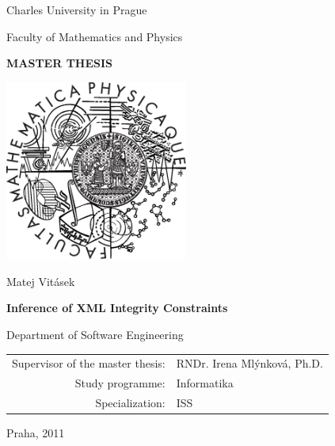 \documentclass[a4paper,12pt,twoside]{report}
\theoremstyle{definition}
\def\mfauthor{Matej Vitásek}
\def\mfadvisor{RNDr. Ire\-na Mlýn\-ko\-vá, Ph.D.}
\def\mfplacedate{Praha, 2011}
\begin{document}
\pagestyle{empty}
\begin{center}

\large

Charles University in Prague

\medskip

Faculty of Mathematics and Physics

\vfill

{\bf\Large MASTER THESIS}

\vfill

\centerline{\mbox{\includegraphics[width=60mm]{logo}}}

\vfill
\vspace{5mm}

{\LARGE \mfauthor}

\vspace{15mm}

{\LARGE\bfseries Inference of XML Integrity Constraints}

\vfill

Department of Software Engineering

\vfill

\begin{tabular}{rl}

Supervisor of the master thesis: & 	\mfadvisor \\
\noalign{\vspace{2mm}}
Study programme: & Informatika \\
\noalign{\vspace{2mm}}
Specialization: & ISS \\
\end{tabular}

\vfill

\mfplacedate 

\end{center}
\end{document}
